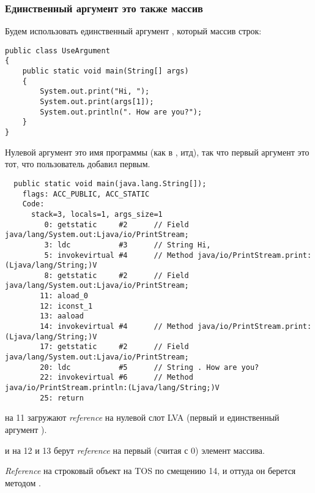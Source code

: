 \subsubsection{Единственный аргумент \main это также массив}


Будем использовать единственный аргумент \main, который массив строк:

\begin{lstlisting}[style=customjava]
public class UseArgument
{
	public static void main(String[] args)
	{
		System.out.print("Hi, ");
		System.out.print(args[1]);
		System.out.println(". How are you?");
	}
}
\end{lstlisting}


Нулевой аргумент это имя программы (как в \CCpp, итд),
так что первый аргумент это тот, что пользователь добавил первым.

\begin{lstlisting}
  public static void main(java.lang.String[]);
    flags: ACC_PUBLIC, ACC_STATIC
    Code:
      stack=3, locals=1, args_size=1
         0: getstatic     #2      // Field java/lang/System.out:Ljava/io/PrintStream;
         3: ldc           #3      // String Hi, 
         5: invokevirtual #4      // Method java/io/PrintStream.print:(Ljava/lang/String;)V
         8: getstatic     #2      // Field java/lang/System.out:Ljava/io/PrintStream;
        11: aload_0       
        12: iconst_1      
        13: aaload        
        14: invokevirtual #4      // Method java/io/PrintStream.print:(Ljava/lang/String;)V
        17: getstatic     #2      // Field java/lang/System.out:Ljava/io/PrintStream;
        20: ldc           #5      // String . How are you?
        22: invokevirtual #6      // Method java/io/PrintStream.println:(Ljava/lang/String;)V
        25: return        
\end{lstlisting}


 на 11 загружают \emph{reference} на нулевой слот \ac{LVA} 
(первый и единственный аргумент \main).

 и  на 12 и 13 берут \emph{reference} на первый (считая с 0) 
элемент массива.

\emph{Reference} на строковый объект на \ac{TOS} по смещению 14, и оттуда он 
берется методом .
